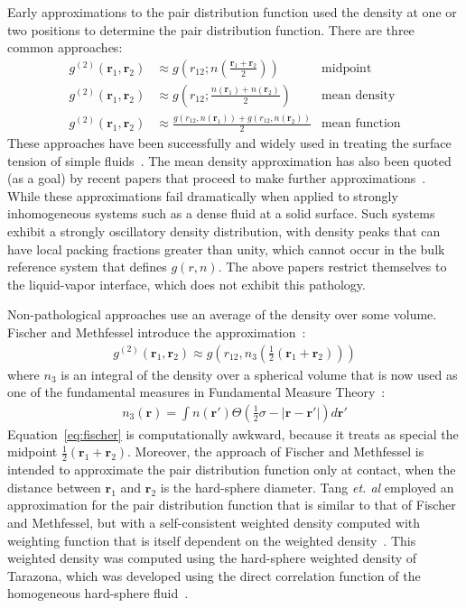 \documentclass[letterpaper,twocolumn,amsmath,amssymb,pre,aps,10pt]{revtex4-1}
\newcommand{\rr}{\textbf{r}}
\begin{document}
Early approximations to the pair distribution function used the
density at one or two positions to determine the pair distribution
function.  There are three common approaches:
\begin{align}
  g^{(2)}(\rr_1,\rr_2) &\approx
  g\left(r_{12};n\left(\frac{\rr_1+\rr_2}{2}\right)\right)
     & \text{midpoint} \\
  g^{(2)}(\rr_1,\rr_2) &\approx
  g\left(r_{12};\frac{n(\rr_1)+n(\rr_2)}{2}\right)
     & \text{mean density} \\
  g^{(2)}(\rr_1,\rr_2) &\approx
  \frac{g(r_{12},n(\rr_1))+g(r_{12},n(\rr_2))}{2}
     & \text{mean function}
\end{align}
These approaches have been successfully and widely used in treating
the surface tension of simple fluids~\cite{pressing2003surface,
  salter2008statistical, bongiorno1975modified,
  toxvaerd1976hydrostatic, kalos1977structure, carey2008gradient,
  osborn1980monotonic, mccoy1981comparison, barrett2006some}.  The
mean density approximation has also been quoted (as a goal) by recent
papers that proceed to make further
approximations~\cite{gloor2007prediction, gross2009density}.  While
these approximations fail dramatically when applied to strongly
inhomogeneous systems such as a dense fluid at a solid surface.  Such
systems exhibit a strongly oscillatory density distribution, with
density peaks that can have local packing fractions greater than
unity, which cannot occur in the bulk reference system that defines
$g(r, n)$.  The above papers restrict themselves to the liquid-vapor
interface, which does not exhibit this pathology.

Non-pathological approaches use an average of the density over some
volume. Fischer and Methfessel introduce the
approximation~\cite{fischer1980born,harris1987comment}:
\begin{align}
  g^{(2)}(\rr_1,\rr_2) \approx g\left(r_{12}, n_3\left(\tfrac12
  (\rr_1+\rr_2)\right)\right)
  \label{eq:fischer}
\end{align}
where $n_3$ is an integral of the density over a spherical volume that
is now used as one of the fundamental measures in Fundamental
Measure Theory~\cite{rosenfeld1989free}:
\begin{align}
  n_3(\rr) = \int n(\rr')\Theta(\tfrac12 \sigma - |\rr-\rr'|) d\rr'
\end{align}
Equation~\ref{eq:fischer} is computationally awkward, because it
treats as special the midpoint $\tfrac12(\rr_1+\rr_2)$.  Moreover, the
approach of Fischer and Methfessel is intended to approximate the pair
distribution function only at contact, when the distance between
$\rr_1$ and $\rr_2$ is the hard-sphere diameter.
%
Tang \emph{et. al} employed an approximation for the pair distribution
function that is similar to that of Fischer and Methfessel, but with a
self-consistent weighted density computed with weighting function that
is itself dependent on the weighted density~\cite{tang1991density}.
This weighted density was computed using the hard-sphere weighted
density of Tarazona, which was developed using the direct correlation
function of the homogeneous hard-sphere fluid~\cite{tarazona1985free}.
\end{document}
